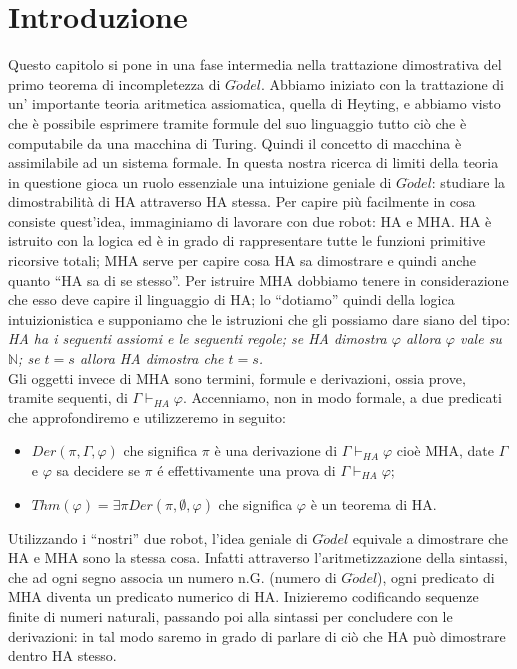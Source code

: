 \section{Introduzione}
Questo capitolo si pone in una fase intermedia nella trattazione dimostrativa del primo teorema di incompletezza di $G\ddot{o}del$. Abbiamo iniziato con la trattazione di un' importante teoria aritmetica assiomatica, quella di Heyting, e abbiamo visto che \`e possibile esprimere tramite formule del suo linguaggio tutto ci\`o che  \`e computabile da una macchina di Turing. Quindi il concetto di macchina \`e assimilabile ad un sistema formale.
In questa nostra ricerca di limiti della teoria in questione gioca un ruolo essenziale una intuizione geniale di $G\ddot{o}del$:
studiare la dimostrabilit\`a di HA attraverso HA stessa. Per capire pi\`u facilmente in cosa consiste quest'idea,
immaginiamo di lavorare con due robot: HA e MHA. HA \`e istruito con la logica ed \`e in grado di rappresentare tutte
le funzioni primitive ricorsive totali;
MHA serve per capire cosa HA sa dimostrare e quindi anche quanto ``HA sa di se stesso''.
Per istruire MHA dobbiamo tenere in considerazione che esso deve capire il linguaggio di HA; lo ``dotiamo'' quindi della logica intuizionistica e supponiamo che le istruzioni che gli possiamo dare siano del tipo: \emph{HA ha i seguenti assiomi e le seguenti regole;
se HA dimostra $\varphi$ allora $\varphi$ vale su $\mathbb {N}$; se $t=s$ allora HA dimostra che $t=s$.}\\
Gli oggetti invece di MHA sono termini, formule e derivazioni, ossia prove, tramite sequenti, di $\Gamma\vdash_{HA}\varphi$.
Accenniamo, non in modo formale, a due predicati che approfondiremo e utilizzeremo in seguito:
\begin{itemize}
\item $Der(\pi,\Gamma,\varphi)$ che significa $\pi$ \`e una derivazione di $\Gamma\vdash_{HA}\varphi$ cio\`e MHA, date $\Gamma$ e $\varphi$ sa decidere se $\pi$ \'e effettivamente una prova di $\Gamma\vdash_{HA}\varphi$;
\item $Thm(\varphi)=\exists\pi Der(\pi,\emptyset,\varphi)$ che significa $\varphi$ \`e un teorema di HA.
\end{itemize}
Utilizzando i ``nostri'' due robot, l'idea geniale di $G\ddot{o}del$ equivale a dimostrare che HA e MHA sono la stessa cosa. Infatti attraverso l'aritmetizzazione della sintassi, che ad ogni segno associa un numero n.G. (numero di $G\ddot{o}del$), ogni predicato di MHA diventa un predicato numerico di HA. Inizieremo codificando sequenze finite di numeri naturali, passando poi alla sintassi per concludere con le derivazioni: in tal modo saremo in grado di parlare di ci\`o che HA pu\`o dimostrare dentro HA stesso.





